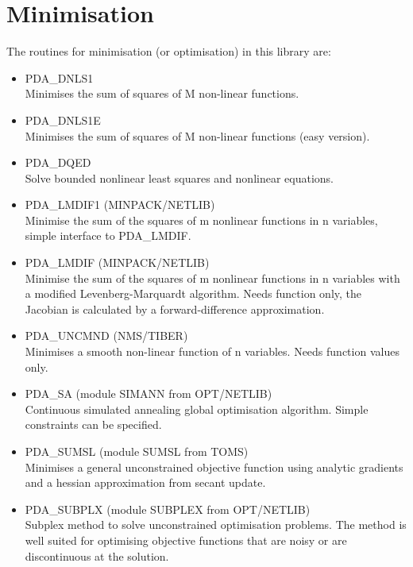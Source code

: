 \documentclass[11pt,twoside]{article}
\newcommand{\htmlref}[2]{#1}
\newcommand{\xlabel}[1]{}
\begin{document}
\section{\xlabel{minimisation}Minimisation}

   The routines for minimisation (or optimisation) in this library are:

\begin{itemize}

\item \htmlref{PDA\_DNLS1}{PDA\_DNLS1} \\
   Minimises the sum of squares of M non-linear functions.

\item \htmlref{PDA\_DNLS1E}{PDA\_DNLS1E} \\
   Minimises the sum of squares of M non-linear functions (easy version).

\item \htmlref{PDA\_DQED}{PDA\_DQED} \\
   Solve bounded nonlinear least squares and nonlinear equations.

\item \htmlref{PDA\_LMDIF1}{PDA\_LMDIF1} (MINPACK/NETLIB)\ \\
   Minimise the sum of the squares of m nonlinear functions in n
   variables, simple interface to PDA\_LMDIF.

\item \htmlref{PDA\_LMDIF}{PDA\_LMDIF} (MINPACK/NETLIB)\ \\
   Minimise the sum of the squares of m nonlinear functions in n
   variables with a modified Levenberg-Marquardt algorithm. Needs
   function only, the Jacobian is calculated by a forward-difference
   approximation.

\item \htmlref{PDA\_UNCMND}{PDA\_UNCMND} (NMS/TIBER)\ \\
   Minimises a smooth non-linear function of n variables. Needs
   function values only.

\item \htmlref{PDA\_SA}{PDA\_SA} (module SIMANN from OPT/NETLIB)\ \\
   Continuous simulated annealing global optimisation algorithm.
   Simple constraints can be specified.

\item \htmlref{PDA\_SUMSL}{PDA\_SUMSL} (module SUMSL from TOMS)\ \\
   Minimises a general unconstrained objective function using
   analytic gradients and a hessian approximation from secant update.

\item \htmlref{PDA\_SUBPLX}{PDA\_SUBPLX} (module SUBPLEX from OPT/NETLIB)\ \\
   Subplex method to solve unconstrained optimisation problems.  The
   method is well suited for optimising objective functions that are
   noisy or are discontinuous at the solution.

\end{itemize}
\end{document}
